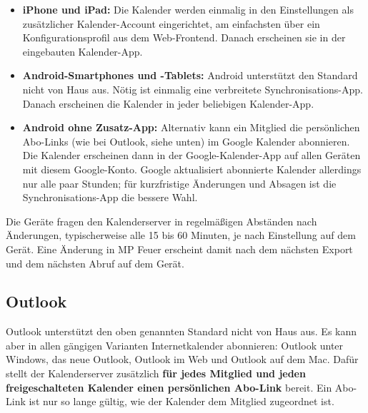 \documentclass[a4paper,fontsize=10pt]{scrartcl}
\begin{document}
\begin{itemize}
  \item \textbf{iPhone und iPad:} Die Kalender werden einmalig in den
        Einstellungen als zusätzlicher Kalender-Account eingerichtet, am
        einfachsten über ein Konfigurationsprofil aus dem Web-Frontend.
        Danach erscheinen sie in der eingebauten Kalender-App.
  \item \textbf{Android-Smartphones und -Tablets:} Android unterstützt den
        Standard nicht von Haus aus. Nötig ist einmalig eine verbreitete
        Synchronisations-App. Danach erscheinen die Kalender in jeder
        beliebigen Kalender-App.
  \item \textbf{Android ohne Zusatz-App:} Alternativ kann ein Mitglied die
        persönlichen Abo-Links (wie bei Outlook, siehe unten) im
        Google Kalender abonnieren. Die Kalender erscheinen dann in der
        Google-Kalender-App auf allen Geräten mit diesem Google-Konto.
        Google aktualisiert abonnierte Kalender allerdings nur alle paar
        Stunden; für kurzfristige Änderungen und Absagen ist die
        Synchronisations-App die bessere Wahl.
\end{itemize}

Die Geräte fragen den Kalenderserver in regelmäßigen Abständen nach
Änderungen, typischerweise alle 15 bis 60 Minuten, je nach Einstellung auf dem
Gerät. Eine Änderung in MP Feuer erscheint damit nach dem nächsten Export und
dem nächsten Abruf auf dem Gerät.

\subsection*{Outlook}

Outlook unterstützt den oben genannten Standard nicht von Haus aus. Es kann
aber in allen gängigen Varianten Internetkalender abonnieren: Outlook unter
Windows, das neue Outlook, Outlook im Web und Outlook auf dem Mac. Dafür stellt
der Kalenderserver zusätzlich \textbf{für jedes Mitglied und jeden
freigeschalteten Kalender einen persönlichen Abo-Link} bereit. Ein Abo-Link
ist nur so lange gültig, wie der Kalender dem Mitglied zugeordnet ist.
\end{document}
